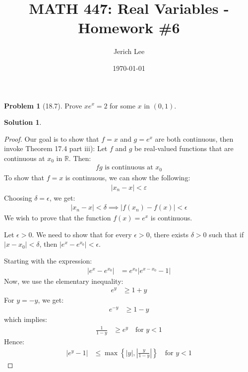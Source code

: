 \documentclass[12pt]{article}
\title{MATH 447: Real Variables - Homework \#6}
\author{Jerich Lee}
\date{\today}
\theoremstyle{definition} %
\newtheorem{solution}{Solution}
\newtheorem{problem}{Problem}
\theoremstyle{plain} %
\begin{document}
\maketitle
\begin{problem}[18.7]
  Prove $xe^{x} =2$ for some $x$ in $(0,1)$.  
\end{problem}
\begin{solution}
  \begin{proof}
    Our goal is to show that $f=x$ and $g=e^{x}$ are both continuous, then invoke Theorem 17.4 part iii): Let $f$ and $g$ be real-valued functions that are continuous at $x_0$ in $\mathbb{R} $. Then: 
    \begin{align}
     fg \text{ is continuous at } x_0 
    \end{align}
    To show that $f=x$ is continuous, we can show the following:
    \begin{align}
     \left\vert x_n -x\right\vert <\varepsilon
    \end{align}
    Choosing $\delta =\epsilon $, we get:
    \begin{align}
     \left\vert x_{n} -x \right\vert <\delta \implies \left\vert f(x_n)-f(x) \right\vert <\epsilon
    \end{align} 
    We wish to prove that the function $ f(x) = e^x $ is continuous.
  
    Let $ \epsilon > 0 $. We need to show that for every $ \epsilon > 0 $, there exists $ \delta > 0 $ such that if $ |x - x_0| < \delta $, then $ |e^x - e^{x_0}| < \epsilon $.
    
    Starting with the expression:
    \begin{align}
    |e^x - e^{x_0}| &= e^{x_0} |e^{x - x_0} - 1|
    \end{align}
    Now, we use the elementary inequality:
    \begin{align}
    e^y &\geq 1 + y
    \end{align}
    For $ y = -y $, we get:
    \begin{align}
    e^{-y} &\geq 1 - y
    \end{align}
    which implies:
    \begin{align}
    \frac{1}{1 - y} &\geq e^y \quad \text{for } y < 1
    \end{align}
    Hence:
    \begin{align}
    |e^y - 1| &\leq \max \left\{ |y|, \left| \frac{y}{1 - y} \right| \right\} \quad \text{for } y < 1
    \end{align}
    

\end{proof}
\end{solution}
\end{document}

